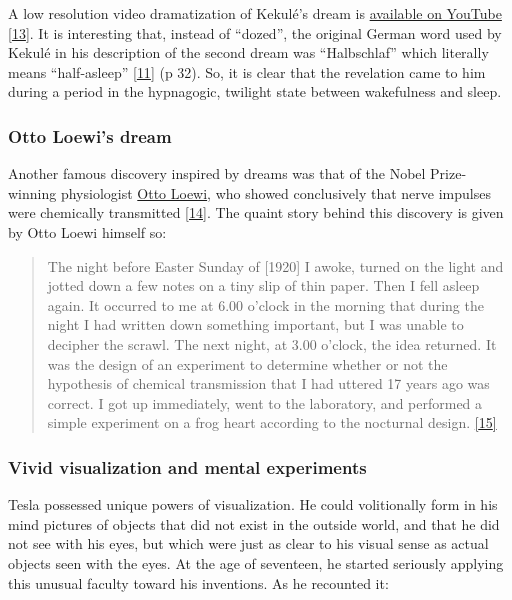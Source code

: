 \documentclass[
  a4paper,
]{article}
\begin{document}
A low resolution video dramatization of Kekulé's dream is
\href{https://www.youtube.com/watch?v=2NRwd-JJFm4}{available on YouTube}
\protect\hyperlink{ref-kekules-dream}{{[}13{]}}. It is interesting that,
instead of ``dozed'', the original German word used by Kekulé in his
description of the second dream was ``Halbschlaf'' which literally means
``half-asleep'' \protect\hyperlink{ref-weisberg86}{{[}11{]}} (p 32). So,
it is clear that the revelation came to him during a period in the
hypnagogic, twilight state between wakefulness and sleep.

\hypertarget{otto-loewis-dream}{%
\subsubsection{Otto Loewi's dream}\label{otto-loewis-dream}}

Another famous discovery inspired by dreams was that of the Nobel
Prize-winning physiologist
\href{https://en.wikipedia.org/wiki/Otto_Loewi}{Otto Loewi}, who showed
conclusively that nerve impulses were chemically transmitted
\protect\hyperlink{ref-justin06}{{[}14{]}}. The quaint story behind this
discovery is given by Otto Loewi himself so:

\begin{quote}
The night before Easter Sunday of {[}1920{]} I awoke, turned on the
light and jotted down a few notes on a tiny slip of thin paper. Then I
fell asleep again. It occurred to me at 6.00 o'clock in the morning that
during the night I had written down something important, but I was
unable to decipher the scrawl. The next night, at 3.00 o'clock, the idea
returned. It was the design of an experiment to determine whether or not
the hypothesis of chemical transmission that I had uttered 17 years ago
was correct. I got up immediately, went to the laboratory, and performed
a simple experiment on a frog heart according to the nocturnal design.
\protect\hyperlink{ref-loewi2014}{{[}15{]}}
\end{quote}

\hypertarget{vivid-visualization-and-mental-experiments}{%
\subsubsection{Vivid visualization and mental
experiments}\label{vivid-visualization-and-mental-experiments}}

Tesla possessed unique powers of visualization. He could volitionally
form in his mind pictures of objects that did not exist in the outside
world, and that he did not see with his eyes, but which were just as
clear to his visual sense as actual objects seen with the eyes. At the
age of seventeen, he started seriously applying this unusual faculty
toward his inventions. As he recounted it:
\end{document}
